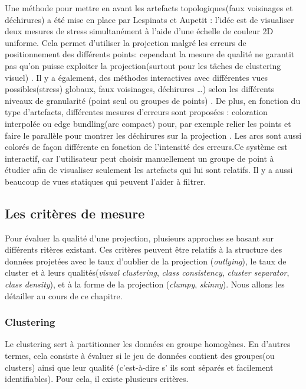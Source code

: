 Une méthode pour mettre en avant les artefacts topologiques(faux voisinages et déchirures) a été mise en place par Lespinats et Aupetit \cite{CheckViz} : l’idée est de visualiser deux mesures de stress simultanément à l’aide d’une échelle de couleur 2D uniforme. 
Cela permet d’utiliser la projection malgré les erreurs de positionnement des différents points: cependant la mesure de qualité ne garantit pas qu’on puisse exploiter la projection(surtout pour les tâches de clustering visuel) .
\newline
Il y a également, des méthodes interactives avec différentes vues
possibles(stress) globaux, faux voisinages, déchirures …) selon les différents niveaux de
granularité (point seul ou groupes de points) \cite{abbas2019clustme} \cite{HeulotThese}. De plus, en fonction du type d’artefacts,
différentes mesures d’erreurs sont proposées : coloration interpolée ou edge bundling(arc
compact) pour, par exemple relier les points et faire le parallèle pour montrer les déchirures
sur la projection \cite{holten2006-EDGE1} \cite{holten2011-EDGE2} \cite{HeulotThese}. Les arcs sont aussi colorés de façon différente en fonction de l’intensité
des erreurs.\newline Ce système est interactif, car l’utilisateur peut choisir manuellement un groupe de point à
étudier afin de visualiser seulement les artefacts qui lui sont relatifs. Il y a aussi beaucoup de
vues statiques qui peuvent l’aider à filtrer.

\subsection{Les critères de mesure}

Pour évaluer la qualité d’une projection, plusieurs approches se basant sur différents ritères existant.
Ces critères peuvent être relatifs à la structure des données projetées avec le taux d’oublier de la projection (\textit{outlying}), le taux de cluster et à leurs qualités(\textit{visual clustering}, \textit{class consistency}, \textit{cluster separator}, \textit{class density}), et à la forme de la projection (\textit{clumpy}, \textit{skinny}).
Nous allons les détailler au cours de ce chapitre.

\subsubsection{Clustering}
Le clustering sert à partitionner les données en groupe homogènes. En d’autres termes, cela consiste à évaluer si le jeu de données contient des groupes(ou clusters) ainsi que leur qualité (c'est-à-dire s’ ils sont séparés et facilement identifiables).
Pour cela, il existe plusieurs critères.

